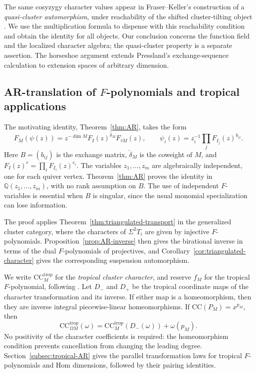 \documentclass[11pt]{amsart}
\numberwithin{equation}{section}
\theoremstyle{definition}
\theoremstyle{remark}
\newcommand{\CC}{\mathrm{CC}}
\newcommand{\QQ}{\mathbb Q}
\newcommand{\dv}{\underline{\dim}}
\begin{document}
The same cosyzygy character values appear in Fraser--Keller's
construction of a \emph{quasi-cluster automorphism}, under reachability
of the shifted cluster-tilting object
\cite[Theorem~A.9 and Example~A.10]{FrK23}. We use the multiplication
formula to dispense with this reachability condition and obtain the
identity for all objects. Our conclusion concerns the function field
and the localized character algebra; the quasi-cluster property is a
separate assertion. The horseshoe argument extends Pressland's
exchange-sequence calculation \cite[proof of Theorem~5.27]{Pre} to
extension spaces of arbitrary dimension.

\subsection*{AR-translation of \texorpdfstring{$F$}{F}-polynomials and tropical applications}
The motivating identity, Theorem~\ref{thm:AR}, takes the form
\[ F_M(\psi(z))=z^{-\dv M}F_I(z)^{\check\delta_M}F_{\tau M}(z),\qquad \psi_i(z)=z_i^{-1}\prod_jF_{I_j}(z)^{b_{ij}}. \]
Here $B=(b_{ij})$ is the exchange matrix, $\check\delta_M$ is the
coweight of $M$, and $F_I(z)^c=\prod_iF_{I_i}(z)^{c_i}$. The variables
$z_1,\ldots,z_m$ are algebraically independent, one for each quiver
vertex. Theorem~\ref{thm:AR} proves the identity in
$\QQ(z_1,\ldots,z_m)$, with no rank assumption on $B$. The use of
independent $F$-variables is essential when $B$ is singular, since the
usual monomial specialization can lose information.

The proof applies Theorem~\ref{thm:triangulated-transport} in the
generalized cluster category, where the characters of $\Sigma^2T_i$ are
given by injective $F$-polynomials. Proposition~\ref{prop:AR-inverse}
then gives the birational inverse in terms of the dual $F$-polynomials of
projectives, and Corollary~\ref{cor:triangulated-character} gives the
corresponding suspension automorphism.

We write $\CC^{\mathrm{trop}}_M$ for the \emph{tropical cluster
character}, and reserve $f_M$ for the tropical $F$-polynomial,
following \cite{FeiT23}. Let $D_-$ and $D_+$ be the tropical coordinate
maps of the character transformation and its inverse. If either map is a
homeomorphism, then they are inverse integral piecewise-linear
homeomorphisms. If $\CC(P_M)=x^{p_M}$, then
\[ \CC^{\mathrm{trop}}_{\Omega M}(\omega)=\CC^{\mathrm{trop}}_M(D_-(\omega))+\omega(p_M). \]
No positivity of the character coefficients is required: the homeomorphism
condition prevents cancellation from changing the leading degree.
Section~\ref{subsec:tropical-AR} gives the parallel transformation laws for
tropical $F$-polynomials and Hom dimensions, followed by their pairing
identities.
\end{document}
